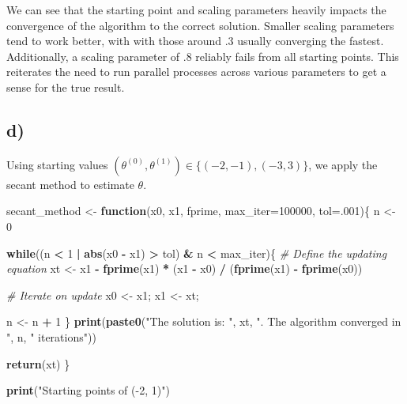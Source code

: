 \documentclass[]{article}
\newenvironment{Shaded}{\begin{snugshade}}{\end{snugshade}}
\newcommand{\KeywordTok}[1]{\textcolor[rgb]{0.13,0.29,0.53}{\textbf{#1}}}
\newcommand{\DataTypeTok}[1]{\textcolor[rgb]{0.13,0.29,0.53}{#1}}
\newcommand{\DecValTok}[1]{\textcolor[rgb]{0.00,0.00,0.81}{#1}}
\newcommand{\StringTok}[1]{\textcolor[rgb]{0.31,0.60,0.02}{#1}}
\newcommand{\CommentTok}[1]{\textcolor[rgb]{0.56,0.35,0.01}{\textit{#1}}}
\newcommand{\ControlFlowTok}[1]{\textcolor[rgb]{0.13,0.29,0.53}{\textbf{#1}}}
\newcommand{\OperatorTok}[1]{\textcolor[rgb]{0.81,0.36,0.00}{\textbf{#1}}}
\newcommand{\NormalTok}[1]{#1}
\begin{document}
We can see that the starting point and scaling parameters heavily
impacts the convergence of the algorithm to the correct solution.
Smaller scaling parameters tend to work better, with with those around
\(.3\) usually converging the fastest. Additionally, a scaling parameter
of \(.8\) reliably fails from all starting points. This reiterates the
need to run parallel processes across various parameters to get a sense
for the true result.

\subsection{d)}\label{d-1}

Using starting values
\((\theta^{(0)}, \theta^{(1)}) \in \{(-2, -1), (-3, 3)\}\), we apply the
secant method to estimate \(\theta\).

\begin{Shaded}
\begin{Highlighting}[]
\NormalTok{secant_method <-}\StringTok{ }\ControlFlowTok{function}\NormalTok{(x0, x1, fprime, }\DataTypeTok{max_iter=}\DecValTok{100000}\NormalTok{, }\DataTypeTok{tol=}\NormalTok{.}\DecValTok{001}\NormalTok{)\{}
\NormalTok{  n <-}\StringTok{ }\DecValTok{0}
  
  \ControlFlowTok{while}\NormalTok{((n }\OperatorTok{<}\StringTok{ }\DecValTok{1} \OperatorTok{|}\StringTok{ }\KeywordTok{abs}\NormalTok{(x0 }\OperatorTok{-}\StringTok{ }\NormalTok{x1) }\OperatorTok{>}\StringTok{ }\NormalTok{tol) }\OperatorTok{&}\StringTok{ }\NormalTok{n }\OperatorTok{<}\StringTok{ }\NormalTok{max_iter)\{}
    \CommentTok{# Define the updating equation}
\NormalTok{    xt <-}\StringTok{ }\NormalTok{x1 }\OperatorTok{-}\StringTok{ }\KeywordTok{fprime}\NormalTok{(x1) }\OperatorTok{*}\StringTok{ }\NormalTok{(x1 }\OperatorTok{-}\StringTok{ }\NormalTok{x0) }\OperatorTok{/}\StringTok{ }\NormalTok{(}\KeywordTok{fprime}\NormalTok{(x1) }\OperatorTok{-}\StringTok{ }\KeywordTok{fprime}\NormalTok{(x0))}
    
    \CommentTok{# Iterate on update}
\NormalTok{    x0 <-}\StringTok{ }\NormalTok{x1; x1 <-}\StringTok{ }\NormalTok{xt;  }
    
\NormalTok{    n <-}\StringTok{ }\NormalTok{n }\OperatorTok{+}\StringTok{ }\DecValTok{1}
\NormalTok{  \}}
  \KeywordTok{print}\NormalTok{(}\KeywordTok{paste0}\NormalTok{(}\StringTok{"The solution is: "}\NormalTok{, xt, }\StringTok{". The algorithm converged in "}\NormalTok{, n, }\StringTok{" iterations"}\NormalTok{))}
  
  \KeywordTok{return}\NormalTok{(xt)}
\NormalTok{\}}

\KeywordTok{print}\NormalTok{(}\StringTok{"Starting points of (-2, 1)"}\NormalTok{)}
\end{Highlighting}
\end{Shaded}
\end{document}
